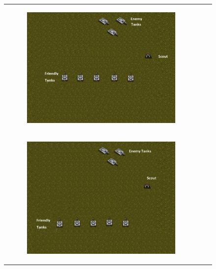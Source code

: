 \documentclass[11pt,letterpaper]{article}
\begin{document}
\begin{figure}
{\begin{tabular}{ccc}
\begin{subfigure}[b]{0.33\textwidth}\includegraphics[width=\textwidth]{figures/tanks-close.jpg}\caption{}\label{fig:tanks-a}\end{subfigure}\\
\begin{subfigure}[b]{0.33\textwidth}\includegraphics[width=\textwidth]{figures/tanks-far.jpg}\caption{}\label{fig:tanks-b}\end{subfigure}&

\end{tabular}}
\end{figure}
\end{document}
